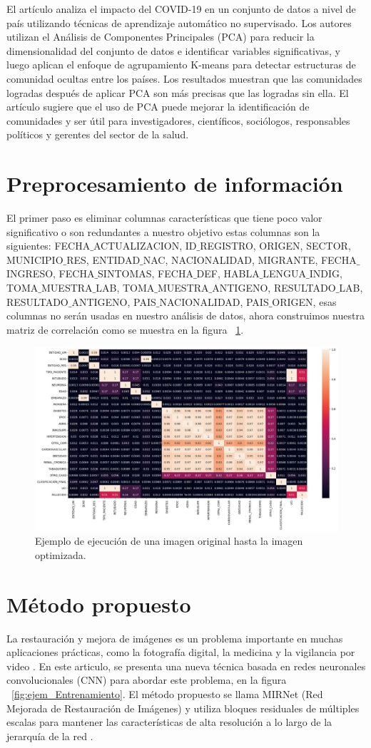 \documentclass[a4paper,
               ]{jacow}
\begin{document}
El artículo \cite{Chaudhary2021} analiza el impacto del COVID-19 en un conjunto de datos a nivel de país utilizando técnicas de aprendizaje automático no supervisado. Los autores utilizan el Análisis de Componentes Principales (PCA) para reducir la dimensionalidad del conjunto de datos e identificar variables significativas, y luego aplican el enfoque de agrupamiento K-means para detectar estructuras de comunidad ocultas entre los países. Los resultados muestran que las comunidades logradas después de aplicar PCA son más precisas que las logradas sin ella. El artículo sugiere que el uso de PCA puede mejorar la identificación de comunidades y ser útil para investigadores, científicos, sociólogos, responsables políticos y gerentes del sector de la salud.


\section{Preprocesamiento de información}

El primer paso es eliminar columnas características que tiene poco valor significativo o son redundantes a nuestro objetivo estas columnas son la siguientes:   FECHA$\_$ACTUALIZACION, ID$\_$REGISTRO, ORIGEN, SECTOR, MUNICIPIO$\_$RES, ENTIDAD$\_$NAC,    NACIONALIDAD, MIGRANTE, FECHA$\_$INGRESO, FECHA$\_$SINTOMAS, FECHA$\_$DEF, HABLA$\_$LENGUA$\_$INDIG, TOMA$\_$MUESTRA$\_$LAB, TOMA$\_$MUESTRA$\_$ANTIGENO, RESULTADO$\_$LAB, RESULTADO$\_$ANTIGENO, PAIS$\_$NACIONALIDAD, PAIS$\_$ORIGEN, esas columnas no serán usadas en nuestro análisis de datos, ahora construimos nuestra matriz de correlación como se muestra en la figura  ~\ref{fig:matrix_correlacion}.

\begin{figure}[!h]
    \centering
    \includegraphics*[width=.5\textwidth]{matrizdeCorrelacion}
    \caption{Ejemplo de ejecución de una imagen original hasta la imagen optimizada.}
    \label{fig:matrix_correlacion}
\end{figure}

\section{Método propuesto}
La restauración y mejora de imágenes es un problema importante en muchas aplicaciones prácticas, como la fotografía digital, la medicina y la vigilancia por video \cite{zhang2017beyond}. En este articulo, se presenta una nueva técnica basada en redes neuronales convolucionales (CNN) para abordar este problema, en la figura ~\ref{fig:ejem_Entrenamiento}. El método propuesto se llama MIRNet (Red Mejorada de Restauración de Imágenes) y utiliza bloques residuales de múltiples escalas para mantener las características de alta resolución a lo largo de la jerarquía de la red \cite{tian2020learning}.
\end{document}
